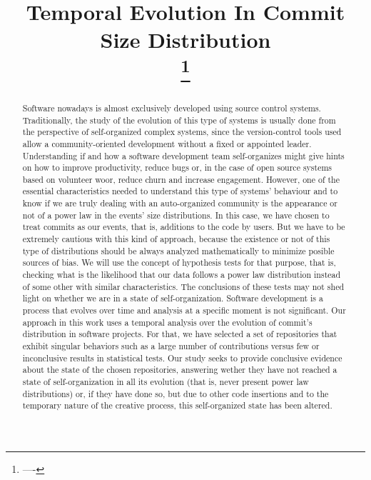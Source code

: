 \documentclass[conference]{IEEEtran}
\begin{document}
\title{Temporal Evolution In Commit Size Distribution\\
  \thanks{----} }

\author{ \IEEEauthorblockA{-}
  \and {} \IEEEauthorblockA{-}
}

\maketitle

\begin{abstract}
  Software nowadays is almost exclusively developed using source
  control systems. Traditionally, the study of the evolution of this
  type of systems is usually done from the perspective of
  self-organized complex systems, since the version-control tools used
  allow a community-oriented development without a fixed or appointed
  leader. Understanding if and how a software development team
  self-organizes might give hints on how to improve productivity,
  reduce bugs or, in the case of open source systems based on
  volunteer woor, reduce churn and increase engagement.  However, one
  of the essential characteristics needed to understand this type of
  systems' behaviour and to know if we are truly dealing with an
  auto-organized community is the appearance or not of a power law in
  the events' size distributions.  In this case, we have chosen to
  treat commits as our events, that is, additions to the code by
  users.
  But we have to be extremely cautious with this kind of approach,
  because the existence or not of this type of distributions should be
  always analyzed mathematically to minimize posible sources of bias.
  We will use the concept of hypothesis tests for that purpose, that
  is, checking what is the likelihood that our data follows a power
  law distribution instead of some other with similar characteristics.
  The conclusions of these tests may not shed light on whether we are
  in a state of self-organization.  Software development is a process
  that evolves over time and analysis at a specific moment is not
  significant.  Our approach in this work uses a temporal analysis
  over the evolution of commit's distribution in software
  projects. For that, we have selected a set of repositories that
  exhibit singular behaviors such as a large number of contributions
  versus few or inconclusive results in statistical tests.  Our study
  seeks to provide conclusive evidence about the state of the chosen
  repositories, answering wether they have not reached a state of
  self-organization in all its evolution (that is, never present power
  law distributions) or, if they have done so, but due to other code
  insertions and to the temporary nature of the creative process, this
  self-organized state has been altered.


\end{abstract}
\end{document}
